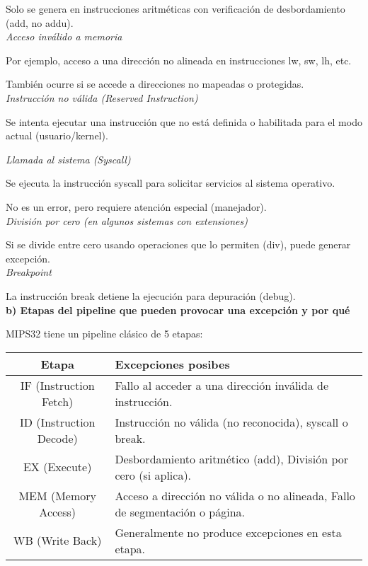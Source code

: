 \documentclass[]{article}
\begin{document}
Solo se genera en instrucciones aritméticas con verificación de desbordamiento (add, no addu). \\

\textit{Acceso inválido a memoria}

Por ejemplo, acceso a una dirección no alineada en instrucciones lw, sw, lh, etc.

También ocurre si se accede a direcciones no mapeadas o protegidas. \\

\textit{Instrucción no válida (Reserved Instruction)}

Se intenta ejecutar una instrucción que no está definida o habilitada para el modo actual (usuario/kernel).

\textit{Llamada al sistema (Syscall)}

Se ejecuta la instrucción syscall para solicitar servicios al sistema operativo.

No es un error, pero requiere atención especial (manejador). \\

\textit{División por cero (en algunos sistemas con extensiones)}

Si se divide entre cero usando operaciones que lo permiten (div), puede generar excepción. \\

\textit{Breakpoint}

La instrucción break detiene la ejecución para depuración (debug). \\

\textbf{b) Etapas del pipeline que pueden provocar una excepción y por qué}

MIPS32 tiene un pipeline clásico de 5 etapas: \\

\begin{tabular}{|c|p{7.5cm}|}
	\hline
	Etapa & Excepciones posibes \\
	\hline
	IF (Instruction Fetch) & Fallo al acceder a una dirección inválida de instrucción. \\
	\hline
	ID (Instruction Decode) & Instrucción no válida (no reconocida), syscall o break. \\
	\hline
	EX (Execute) & Desbordamiento aritmético (add), División por cero (si aplica). \\
	\hline
	MEM (Memory Access) & Acceso a dirección no válida o no alineada, Fallo de segmentación o página. \\
	\hline
	WB (Write Back) &  Generalmente no produce excepciones en esta etapa. \\
	\hline
\end{tabular}
\end{document}
